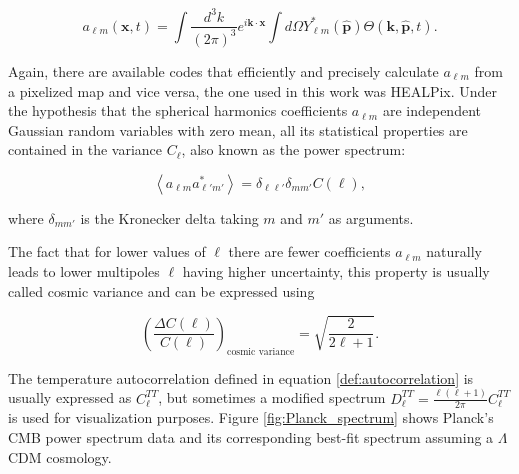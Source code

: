 \documentclass[openany,a4paper,12pt,oneside]{book}
\newcommand{\av}[1]{\left\langle #1 \right\rangle} %
\begin{document}
\begin{spacing}{1.5}
\begin{equation}\label{ch2:alm=int...}
    a_{\ell m}(\mathbf{x}, t)=\int \frac{d^3k}{(2\pi)^3}e^{i\mathbf{k}\cdot\mathbf{x}}\int d\Omega Y_{\ell m}^*(\hat{\mathbf{p}})\Theta(\mathbf{k}, \hat{\mathbf{p}}, t).
\end{equation}

Again, there are available codes that efficiently and precisely calculate $a_{\ell m}$ from a pixelized map and vice versa, the one used in this work was HEALPix\cite{Healpix}. Under the hypothesis that the spherical harmonics coefficients $a_{\ell m}$ are independent Gaussian random variables with zero mean, all its statistical properties are contained in the variance $C_\ell$, also known as the power spectrum:

\begin{equation}\label{def:autocorrelation}
    \av{a_{\ell m} a^*_{\ell' m'}}=\delta_{\ell\ell'}\delta_{mm'}C(\ell),
\end{equation}

\noindent where $\delta_{mm'}$ is the Kronecker delta taking $m$ and $m'$ as arguments.

The fact that for lower values of $\ell$ there are fewer coefficients $a_{\ell m}$ naturally leads to lower multipoles $\ell$ having higher uncertainty, this property is usually called cosmic variance and can be expressed using\cite{dodelson2020modern} 

\begin{equation}\label{cosmic_variance}
    \left(\frac{\Delta C(\ell)}{C(\ell)}\right)_\text{cosmic variance}=\sqrt{\frac{2}{2\ell+1}}.
\end{equation}

The temperature autocorrelation defined in equation \eqref{def:autocorrelation} is usually expressed as $C_\ell^{TT}$, but sometimes a modified spectrum $D_\ell^{TT}=\frac{\ell(\ell+1)}{2\pi}C_\ell^{TT}$ is used for visualization purposes. Figure \ref{fig:Planck_spectrum} shows Planck's CMB power spectrum data and its corresponding best-fit spectrum assuming a $\Lambda$CDM cosmology.


\end{spacing}
\end{document}
